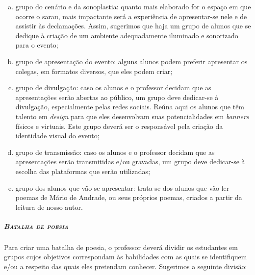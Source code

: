 \documentclass[11pt]{extarticle}
\begin{document}
\begin{enumerate}[(a)]

\item grupo do cenário e da sonoplastia: quanto mais elaborado for o espaço
em que ocorre o sarau, mais impactante será a experiência de
apresentar-se nele e de assistir às declamações. Assim, sugerimos que
haja um grupo de alunos que se dedique à criação de um ambiente
adequadamente iluminado e sonorizado para o evento;

\item grupo de apresentação do evento: alguns alunos podem preferir
apresentar os colegas, em formatos diversos, que eles podem criar;

\item grupo de divulgação: caso os alunos e o professor decidam que as
apresentações serão abertas ao público, um grupo deve dedicar-se à
divulgação, especialmente pelas redes sociais. Reúna aqui os alunos que
têm talento em \emph{design} para que eles desenvolvam suas
potencialidades em \emph{banners} físicos e virtuais. Este grupo deverá
ser o responsável pela criação da identidade visual do evento;

\item grupo de transmissão: caso os alunos e o professor decidam que as
apresentações serão transmitidas e/ou gravadas, um grupo deve dedicar-se
à escolha das plataformas que serão utilizadas;

\item grupo dos alunos que vão se apresentar: trata-se dos alunos que vão
ler poemas de Mário de Andrade, ou seus próprios poemas, criados a
partir da leitura de nosso autor.

\end{enumerate}


\subparagraph{\textsc{Batalha de poesia}}

Para criar uma batalha de poesia, o professor deverá dividir os
estudantes em grupos cujos objetivos correspondam às habilidades com as
quais se identifiquem e/ou a respeito das quais eles pretendam conhecer.
Sugerimos a seguinte divisão:
\end{document}

